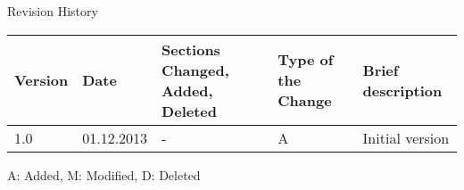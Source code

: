 	\newpage
    \begin{center}
    	\Large Revision History \\
    \end{center}
    \normalsize
	\begin{tabular}{|p{1.2cm}|p{2cm}|p{3cm}|p{1.2cm}|p{7cm}|}
    	\hline
        	Version & Date & Sections Changed, Added, Deleted  & Type of 
the 
Change & Brief description \\
  		\hline
        	1.0 & 01.12.2013 & - & A & Initial version \\
  		\hline
	 \end{tabular}
	
    \hfill *A: Added, M: Modified, D: Deleted
	\newpage{}
	\begin{otherlanguage}{english}
		\tableofcontents
	\end{otherlanguage}
	\newpage
